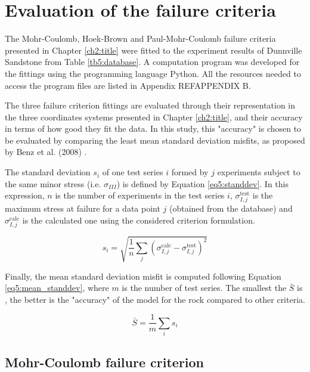 \section{Evaluation of the failure criteria}\label{ch5:evaluation}

The Mohr-Coulomb, Hoek-Brown and Paul-Mohr-Coulomb failure criteria presented in Chapter \ref{ch2:title} were fitted to the experiment results of Dunnville Sandstone from Table \ref{tb5:database}. A computation program was developed for the fittings using the programming language Python. All the resources needed to access the program files are listed in Appendix REF{APPENDIX B}. 

The three failure criterion fittings are evaluated through their representation in the three coordinates systems presented in Chapter \ref{ch2:title}, and their accuracy in terms of how good they fit the data. In this study, this "accuracy" is chosen to be evaluated by comparing the least mean standard deviation misfits, as proposed by Benz et al. (2008) \cite{Benz2008}. 

The standard deviation $s_{i}$ of one test series $i$ formed by $j$ experiments subject to the same minor stress (i.e. $\sigma_{III}$) is defined by Equation \ref{eq5:standdev}. In this expression, $n$ is the number of experiments in the test series $i$, $\sigma_{I,j}^{\mathrm{test}}$ is the maximum stress at failure for a data point $j$ (obtained from the database) and $\sigma_{I,j}^{\mathrm{calc}}$ is the calculated one using the considered criterion formulation. 

\begin{equation}\label{eq5:standdev}
    s_{i}=\sqrt{\frac{1}{n} \sum_{j}\left(\sigma_{I,j}^{\mathrm{calc}}-\sigma_{I,j}^{\mathrm{test}}\right)^{2}}
\end{equation}

Finally, the mean standard deviation misfit is computed following Equation \ref{eq5:mean_standdev}, where $m$ is the number of test series. The smallest the $\bar{S}$ is , the better is the "accuracy" of the model for the rock compared to other criteria. 

\begin{equation}\label{eq5:mean_standdev}
    \bar{S}=\frac{1}{m} \sum_{i} s_{i}
\end{equation}


\subsection{Mohr-Coulomb failure criterion}

